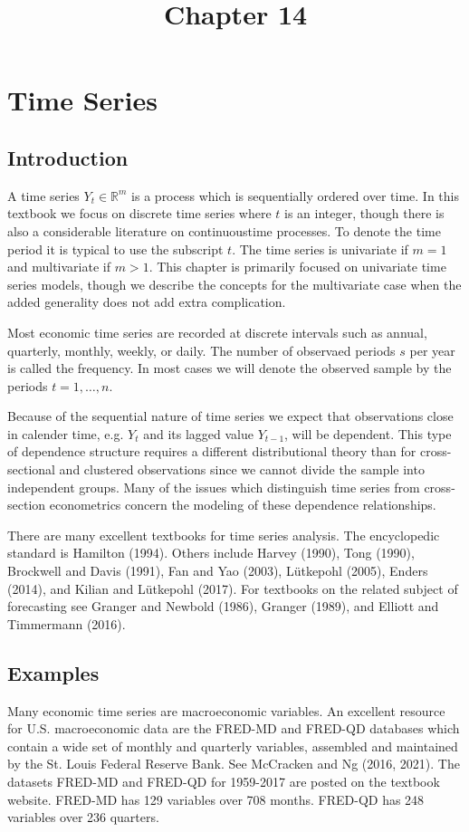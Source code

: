 \documentclass[10pt]{article}
\title{Chapter 14 }
\author{}
\date{}
\begin{document}
\maketitle
\section{Time Series}
\subsection{Introduction}
A time series $Y_{t} \in \mathbb{R}^{m}$ is a process which is sequentially ordered over time. In this textbook we focus on discrete time series where $t$ is an integer, though there is also a considerable literature on continuoustime processes. To denote the time period it is typical to use the subscript $t$. The time series is univariate if $m=1$ and multivariate if $m>1$. This chapter is primarily focused on univariate time series models, though we describe the concepts for the multivariate case when the added generality does not add extra complication.

Most economic time series are recorded at discrete intervals such as annual, quarterly, monthly, weekly, or daily. The number of observaed periods $s$ per year is called the frequency. In most cases we will denote the observed sample by the periods $t=1, \ldots, n$.

Because of the sequential nature of time series we expect that observations close in calender time, e.g. $Y_{t}$ and its lagged value $Y_{t-1}$, will be dependent. This type of dependence structure requires a different distributional theory than for cross-sectional and clustered observations since we cannot divide the sample into independent groups. Many of the issues which distinguish time series from cross-section econometrics concern the modeling of these dependence relationships.

There are many excellent textbooks for time series analysis. The encyclopedic standard is Hamilton (1994). Others include Harvey (1990), Tong (1990), Brockwell and Davis (1991), Fan and Yao (2003), Lütkepohl (2005), Enders (2014), and Kilian and Lütkepohl (2017). For textbooks on the related subject of forecasting see Granger and Newbold (1986), Granger (1989), and Elliott and Timmermann (2016).

\subsection{Examples}
Many economic time series are macroeconomic variables. An excellent resource for U.S. macroeconomic data are the FRED-MD and FRED-QD databases which contain a wide set of monthly and quarterly variables, assembled and maintained by the St. Louis Federal Reserve Bank. See McCracken and Ng (2016, 2021). The datasets FRED-MD and FRED-QD for 1959-2017 are posted on the textbook website. FRED-MD has 129 variables over 708 months. FRED-QD has 248 variables over 236 quarters.
\end{document}
